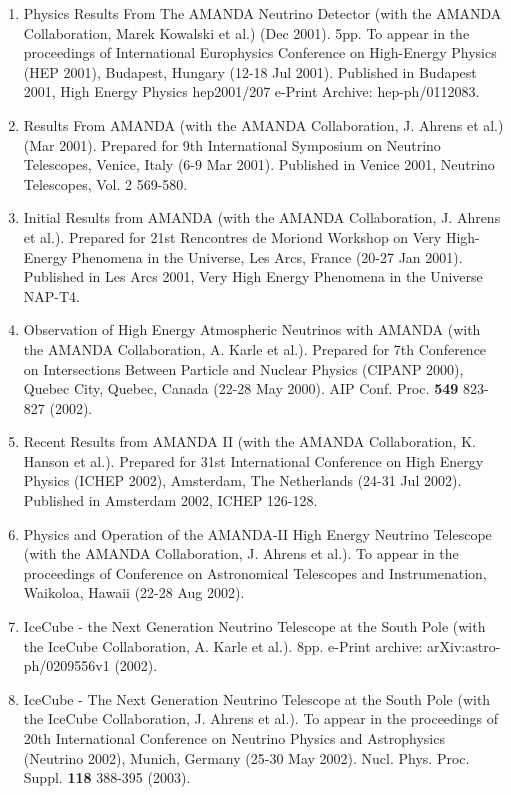 \begin{enumerate}
\item Physics Results From The AMANDA Neutrino Detector (with the AMANDA Collaboration, Marek Kowalski et al.) (Dec 2001). 5pp.  To appear in the proceedings of International Europhysics Conference on High-Energy Physics (HEP 2001), Budapest, Hungary (12-18 Jul 2001).  Published in Budapest 2001, High Energy Physics hep2001/207 e-Print Archive: hep-ph/0112083.

\item Results From AMANDA (with the AMANDA Collaboration, J. Ahrens et al.) (Mar 2001).  Prepared for 9th International Symposium on Neutrino Telescopes, Venice, Italy (6-9 Mar 2001).  Published in Venice 2001, Neutrino Telescopes, Vol. 2 569-580. 

\item Initial Results from AMANDA (with the AMANDA Collaboration, J. Ahrens et al.).  Prepared for 21st Rencontres de Moriond Workshop on Very High-Energy Phenomena in the Universe, Les Arcs, France (20-27 Jan 2001).  Published in Les Arcs 2001, Very High Energy Phenomena in the Universe NAP-T4.

\item Observation of High Energy Atmospheric Neutrinos with AMANDA (with the AMANDA Collaboration, A. Karle et al.).  Prepared for 7th Conference on Intersections Between Particle and Nuclear Physics (CIPANP 2000), Quebec City, Quebec, Canada (22-28 May 2000).   AIP Conf. Proc. {\bf 549} 823-827 (2002).

\item Recent Results from AMANDA II (with the AMANDA Collaboration, K. Hanson et al.).  Prepared for 31st International Conference on High Energy Physics (ICHEP 2002), Amsterdam, The Netherlands (24-31 Jul 2002). Published in Amsterdam 2002, ICHEP 126-128.

\item Physics and Operation of the AMANDA-II High Energy Neutrino Telescope (with the AMANDA Collaboration, J. Ahrens et al.).  To appear in the proceedings of Conference on Astronomical Telescopes and Instrumenation, Waikoloa, Hawaii (22-28 Aug 2002).

\item IceCube - the Next Generation Neutrino Telescope at the South Pole (with the IceCube Collaboration, A. Karle et al.).  8pp.  e-Print archive: 	arXiv:astro-ph/0209556v1 (2002).

\item IceCube - The Next Generation Neutrino Telescope at the South Pole (with the IceCube Collaboration, J. Ahrens et al.).  To appear in the proceedings of 20th International Conference on Neutrino Physics and Astrophysics (Neutrino 2002), Munich, Germany (25-30 May 2002).  Nucl. Phys. Proc. Suppl. {\bf 118} 388-395 (2003).


\end{enumerate}
